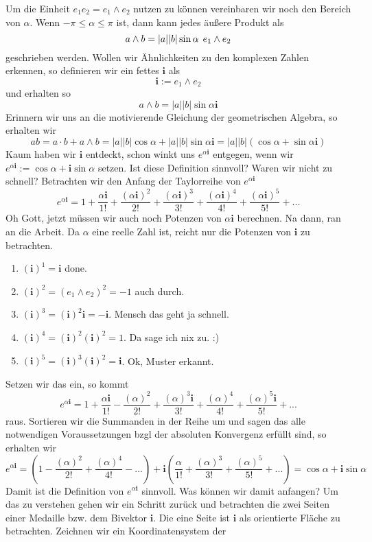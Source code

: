 \documentclass[fleqn]{scrartcl}
\numberwithin{equation}{section}
\def\*#1{\mathbf{#1}}
\begin{document}
Um die Einheit $e_1e_2 = e_1\wedge e_2$ nutzen zu können vereinbaren wir noch
den Bereich von $\alpha$. Wenn $-\pi\leq\alpha\leq\pi$ ist, dann kann jedes
äußere Produkt als
\[a\wedge b= |a||b|\sin\alpha \hspace{1ex} e_1\wedge e_2\]
geschrieben werden. Wollen wir Ähnlichkeiten zu den komplexen Zahlen erkennen,
so definieren wir ein fettes $\*i$ als
\[\*i:= e_1\wedge e_2\]
und erhalten so
\[a\wedge b= |a||b|\sin\alpha\*i\]
Erinnern wir uns an die motivierende Gleichung der geometrischen Algebra, so
erhalten wir
\[ab=a\cdot b + a\wedge b = |a||b|\cos\alpha + |a||b|\sin\alpha\*i =
|a||b|(\cos\alpha + \sin\alpha\*i)\]
Kaum haben wir $\*i$ entdeckt, schon winkt uns $e^{\alpha\*i}$ entgegen, wenn
wir $e^{\alpha\*i} := \cos\alpha + \*i\sin\alpha$ setzen. Ist diese Definition
sinnvoll? Waren wir nicht zu schnell? Betrachten wir den Anfang der
Taylorreihe von $e^{\alpha\*i}$
\[e^{\alpha\*i}=1+\frac{\alpha\*i}{1!}+\frac{(\alpha\*i)^2}{2!}
+\frac{(\alpha\*i)^3}{3!}+\frac{(\alpha\*i)^4}{4!}+\frac{(\alpha\*i)^5}{5!}+ ...\]
Oh Gott, jetzt müssen wir auch noch Potenzen von $\alpha\*i$ berechnen. Na
dann, ran an die Arbeit. Da $\alpha$ eine reelle Zahl ist, reicht nur die
Potenzen von $\*i$ zu betrachten.
\begin{enumerate}
    \item $(\*i)^1=\*i$ done.
    \item $(\*i)^2=(e_1\wedge e_2)^2=-1$ auch durch.
    \item $(\*i)^3 = (\*i)^2\*i = -\*i$. Mensch das geht ja schnell.
    \item $(\*i)^4=(\*i)^2(\*i)^2=1$. Da sage ich nix zu. :)
    \item $(\*i)^5=(\*i)^3(\*i)^2=\*i$. Ok, Muster erkannt.
\end{enumerate}
Setzen wir das ein, so kommt
\[e^{\alpha\*i}=1+\frac{\alpha\*i}{1!}-\frac{(\alpha)^2}{2!}
+\frac{(\alpha)^3\*i}{3!}+\frac{(\alpha)^4}{4!}+\frac{(\alpha)^5\*i}{5!}+ ...\]
raus. Sortieren wir die Summanden in der Reihe um und sagen das alle
notwendigen Voraussetzungen bzgl der absoluten Konvergenz erfüllt sind, so
erhalten wir
\[e^{\alpha\*i}=\left(1-\frac{(\alpha)^2}{2!}+\frac{(\alpha)^4}{4!}-...\right)
+\*i\left(\frac{\alpha}{1!}+\frac{(\alpha)^3}{3!}+\frac{(\alpha)^5}{5!}+
...\right)=\cos\alpha+\*i\sin\alpha\]
Damit ist die Definition von $e^{\alpha\*i}$ sinnvoll. Was können wir damit
anfangen? Um das zu verstehen gehen wir ein Schritt zurück und betrachten die
zwei Seiten einer Medaille bzw. dem Bivektor $\*i$. Die eine Seite ist $\*i$
als orientierte Fläche zu betrachten. Zeichnen wir ein Koordinatensystem der
\end{document}
